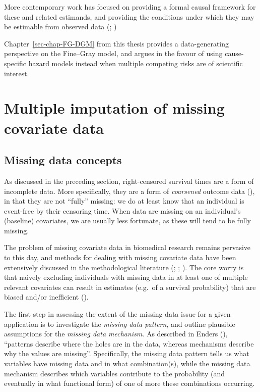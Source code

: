 \documentclass[
  letterpaper,
  paper=240mm:170mm,
  twoside=true,
  open=right,
  fontsize=10pt,
  pagesize=false,
  BCOR=15mm,
  DIV=14,
  headinclude=true,
  footinclude=false,
  headsepline=on]{scrbook}
\begin{document}
More contemporary work has focused on providing a formal causal
framework for these and related estimands, and providing the conditions
under which they may be estimable from observed data
(;
)

Chapter~\ref{sec-chap-FG-DGM} from this thesis provides a
data-generating perspective on the Fine--Gray model, and argues in the
favour of using cause-specific hazard models instead when multiple
competing risks are of scientific interest.

\section{Multiple imputation of missing covariate
data}\label{sec-intro-MI}

\subsection{Missing data concepts}\label{sec-miss-mechs}

As discussed in the preceding section, right-censored survival times are
a form of incomplete data. More specifically, they are a form of
\emph{coarsened} outcome data
(), in that they are not ``fully'' missing: we do at least know that
an individual is event-free by their censoring time. When data are
missing on an individual's (baseline) covariates, we are usually less
fortunate, as these will tend to be fully missing.

The problem of missing covariate data in biomedical research remains
pervasive to this day, and methods for dealing with missing covariate
data have been extensively discussed in the methodological literature
(;
;
).
The core worry is that naively excluding individuals with missing data
in at least one of multiple relevant covariates can result in estimates
(e.g.~of a survival probability) that are biased and/or inefficient
().

The first step in assessing the extent of the missing data issue for a
given application is to investigate the \emph{missing data pattern}, and
outline plausible assumptions for the \emph{missing data mechanism}. As
described in Enders (),
``patterns describe where the holes are in the data, whereas mechanisms
describe why the values are missing''. Specifically, the missing data
pattern tells us what variables have missing data and in what
combination(s), while the missing data mechanism describes which
variables contribute to the probability (and eventually in what
functional form) of one of more these combinations occurring.
\end{document}
